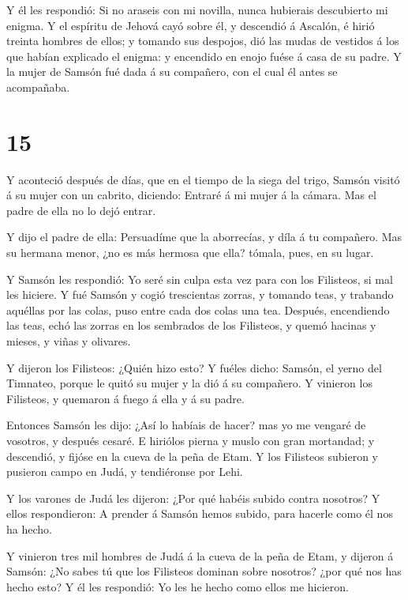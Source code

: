  Y él les respondió: Si no araseis con mi novilla, nunca
hubierais descubierto mi enigma.  Y el espíritu de Jehová
cayó sobre él, y descendió á Ascalón, é hirió treinta hombres de ellos;
y tomando sus despojos, dió las mudas de vestidos á los que habían
explicado el enigma: y encendido en enojo fuése á casa de su padre. Y la
mujer de Samsón fué dada á su compañero, con el cual él antes se
acompañaba.

\hypertarget{section-14}{%
\section{15}\label{section-14}}

 Y aconteció después de días, que en el tiempo de la siega
del trigo, Samsón visitó á su mujer con un cabrito, diciendo: Entraré á
mi mujer á la cámara. Mas el padre de ella no lo dejó entrar.

 Y dijo el padre de ella: Persuadíme que la aborrecías, y
díla á tu compañero. Mas su hermana menor, ¿no es más hermosa que ella?
tómala, pues, en su lugar.

 Y Samsón les respondió: Yo seré sin culpa esta vez para con
los Filisteos, si mal les hiciere.  Y fué Samsón y cogió
trescientas zorras, y tomando teas, y trabando aquéllas por las colas,
puso entre cada dos colas una tea.  Después, encendiendo las
teas, echó las zorras en los sembrados de los Filisteos, y quemó hacinas
y mieses, y viñas y olivares.

 Y dijeron los Filisteos: ¿Quién hizo esto? Y fuéles dicho:
Samsón, el yerno del Timnateo, porque le quitó su mujer y la dió á su
compañero. Y vinieron los Filisteos, y quemaron á fuego á ella y á su
padre.

 Entonces Samsón les dijo: ¿Así lo habíais de hacer? mas yo
me vengaré de vosotros, y después cesaré.  E hiriólos pierna
y muslo con gran mortandad; y descendió, y fijóse en la cueva de la peña
de Etam.  Y los Filisteos subieron y pusieron campo en Judá,
y tendiéronse por Lehi.

 Y los varones de Judá les dijeron: ¿Por qué habéis subido
contra nosotros? Y ellos respondieron: A prender á Samsón hemos subido,
para hacerle como él nos ha hecho.

 Y vinieron tres mil hombres de Judá á la cueva de la peña
de Etam, y dijeron á Samsón: ¿No sabes tú que los Filisteos dominan
sobre nosotros? ¿por qué nos has hecho esto? Y él les respondió: Yo les
he hecho como ellos me hicieron.

